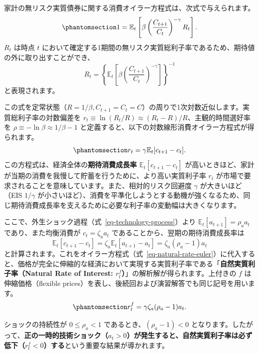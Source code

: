 \documentclass[
  japanese,
  lualatex,
  ja=standard,
  12pt,
  a4paper]{ltjsarticle}
\begin{document}
家計の無リスク実質債券に関する消費オイラー方程式は、次式で与えられます。
\begin{equation}\protect\phantomsection\label{eq-real-bond-euler}{
1 = \mathbb{E}_t \left[ \beta \left( \frac{C_{t+1}}{C_t} \right)^{-\gamma} R_t \right].
}\end{equation} \(R_t\) は時点 \(t\)
において確定する1期間の無リスク実質総利子率であるため、期待値の外に取り出すことができ、
\[
R_t = \left\{ \mathbb{E}_t \left[ \beta \left( \frac{C_{t+1}}{C_t} \right)^{-\gamma} \right] \right\}^{-1}
\] と表現されます。

この式を定常状態（\(R = 1/\beta, C_{t+1}=C_t=C\)）の周りで1次対数近似します。実質総利子率の対数偏差を
\(r_t \equiv \ln(R_t / R) \approx (R_t - R)/R\)、主観的時間選好率を
\(\rho \equiv -\ln\beta \approx 1/\beta - 1\)
と定義すると、以下の対数線形消費オイラー方程式が得られます。
\begin{equation}\protect\phantomsection\label{eq-natural-rate-euler}{
r_t = \gamma \mathbb{E}_t [c_{t+1} - c_t].
}\end{equation} この方程式は、経済全体の\textbf{期待消費成長率
\(\mathbb{E}_t[c_{t+1} - c_t]\)}
が高いときほど、家計が当期の消費を我慢して貯蓄を行うために、より高い実質利子率
\(r_t\) が市場で要求されることを意味しています。また、相対的リスク回避度
\(\gamma\) が大きいほど（EIS \(1/\gamma\)
が小さいほど）、消費を平準化しようとする動機が強くなるため、同じ期待消費成長率を支えるために必要な利子率の変動幅は大きくなります。

ここで、外生ショック過程（式~\ref{eq-technology-process}）より
\(\mathbb{E}_t[a_{t+1}] = \rho_a a_t\) であり、また均衡消費が
\(c_t = \zeta_a a_t\) であることから、翌期の期待消費成長率は \[
\mathbb{E}_t [c_{t+1} - c_t] = \zeta_a \mathbb{E}_t [a_{t+1} - a_t] = \zeta_a (\rho_a - 1) a_t
\]
と計算されます。これをオイラー方程式（式~\ref{eq-natural-rate-euler}）に代入すると、価格が完全に伸縮的な経済において実現する実質利子率である「\textbf{自然実質利子率（Natural
Rate of Interest: \(r_t^f\)）}」の解析解が得られます。上付きの \(f\)
は伸縮価格（flexible
prices）を表し、後続回および演習解答でも同じ記号を用います。
\begin{equation}\protect\phantomsection\label{eq-natural-rate-technology}{
r_t^f = \gamma \zeta_a (\rho_a - 1) a_t.
}\end{equation}

ショックの持続性が \(0 \leq \rho_a < 1\)
であるとき、\((\rho_a - 1) < 0\)
となります。したがって、\textbf{正の一時的技術ショック（\(a_t > 0\)）が発生すると、自然実質利子率は必ず低下（\(r_t^f < 0\)）する}という重要な結果が導かれます。
\end{document}
